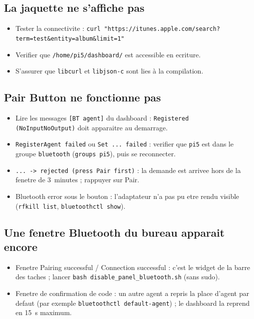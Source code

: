 \documentclass[a4paper,11pt]{article}
\begin{document}
\subsection{La jaquette ne s'affiche pas}

\begin{itemize}
  \item Tester la connectivite :
    \texttt{curl "https://itunes.apple.com/search?term=test\&entity=album\&limit=1"}
  \item Verifier que \texttt{/home/pi5/dashboard/} est accessible en ecriture.
  \item S'assurer que \texttt{libcurl} et \texttt{libjson-c} sont lies à la compilation.
\end{itemize}

\subsection{Pair Button ne fonctionne pas}

\begin{itemize}
  \item Lire les messages \texttt{[BT agent]} du dashboard : \texttt{Registered (NoInputNoOutput)}
    doit apparaitre au demarrage.
  \item \texttt{RegisterAgent failed} ou \texttt{Set ... failed} : verifier que \texttt{pi5}
    est dans le groupe \texttt{bluetooth} (\texttt{groups pi5}), puis se reconnecter.
  \item \texttt{... -> rejected (press Pair first)} : la demande est arrivee hors de la
    fenetre de 3~minutes ; rappuyer sur Pair.
  \item \og Bluetooth error\fg{} sous le bouton : l'adaptateur n'a pas pu etre rendu visible
    (\texttt{rfkill list}, \texttt{bluetoothctl show}).
\end{itemize}

\subsection{Une fenetre Bluetooth du bureau apparait encore}

\begin{itemize}
  \item Fenetre \og Pairing successful / Connection successful\fg{} : c'est le widget de la
    barre des taches ; lancer \texttt{bash disable\_panel\_bluetooth.sh} (sans sudo).
  \item Fenetre de confirmation de code : un autre agent a repris la place d'agent par defaut
    (par exemple \texttt{bluetoothctl default-agent}) ; le dashboard la reprend en 15~s maximum.
\end{itemize}
\end{document}
